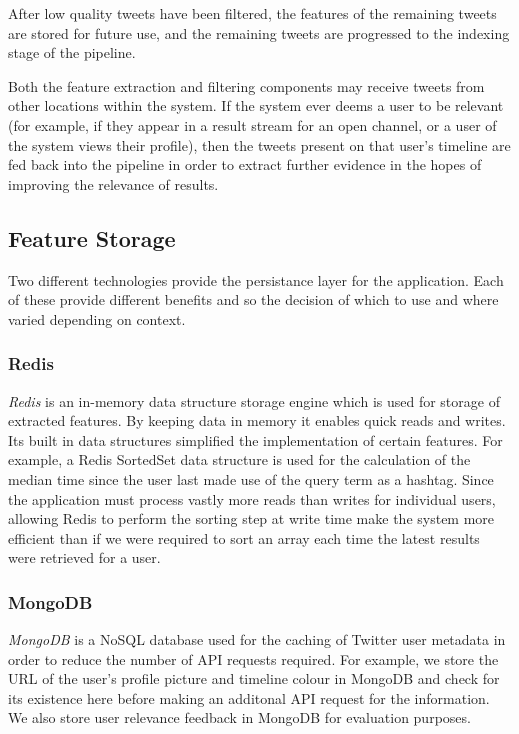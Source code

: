 \documentclass{l4proj}
\begin{document}
        After low quality tweets have been filtered, the features of the remaining tweets are stored for future use, and the remaining tweets are progressed to the indexing stage of the pipeline.

Both the feature extraction and filtering components may receive tweets from other locations within the system. If the system ever deems a user to be relevant (for example, if they appear in a result stream for an open channel, or a user of the system views their profile), then the tweets present on that user’s timeline are fed back into the pipeline in order to extract further evidence in the hopes of improving the relevance of results.

        \subsection{Feature Storage}
        
        Two different technologies provide the persistance layer for the application. Each of these provide different benefits and so the decision of which to use and where varied depending on context.
        
        \subsubsection{Redis}
        \textit{Redis} is an in-memory data structure storage engine which is used for storage of extracted features. By keeping data in memory it enables quick reads and writes. Its built in data structures simplified the implementation of certain features. For example, a Redis SortedSet data structure is used for the calculation of the median time since the user last made use of the query term as a hashtag. Since the application must process vastly more reads than writes for individual users, allowing Redis to perform the sorting step at write time make the system more efficient than if we were required to sort an array each time the latest results were retrieved for a user.
        
         \subsubsection{MongoDB}
         \textit{MongoDB} is a NoSQL database used for the caching of Twitter user metadata in order to reduce the number of API requests required. For example, we store the URL of the user's profile picture and timeline colour in MongoDB and check for its existence here before making an additonal API request for the information. We also store user relevance feedback in MongoDB for evaluation purposes.
         
\end{document}
